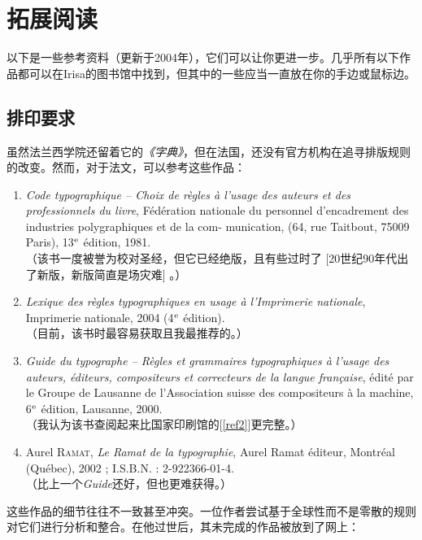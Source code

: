 \chapter{拓展阅读}\label{chap8}

以下是一些参考资料（更新于2004年），它们可以让你更进一步。几乎所有以下作品都可以在Irisa的图书馆中找到，但其中的一些应当一直放在你的手边或鼠标边。

\section{排印要求}

虽然法兰西学院还留着它的\emph{《字典》}，但在法国，还没有官方机构在追寻排版规则的改变。然而，对于法文，可以参考这些作品：

\renewcommand{\labelenumi}{[\theenumi]}

\begin{enumerate}
    \item \emph{Code typographique – Choix de règles à l'usage des auteurs et des professionnels du livre}, Fédération nationale du personnel d'encadrement des industries polygraphiques et de la com- munication, (64, rue Taitbout, 75009 Paris), 13$^{\rm e}$ édition, 1981.\\
    （该书一度被誉为校对圣经，但它已经绝版，且有些过时了 [20世纪90年代出了新版，新版简直是场灾难] 。）\label{ref1}
    \item \emph{Lexique des règles typographiques en usage à l'Imprimerie nationale}, Imprimerie nationale, 2004 (4$^{\rm e}$ édition).\\
    （目前，该书时最容易获取且我最推荐的。） \label{ref2}
    \item \emph{Guide du typographe -- Règles et grammaires typographiques à l'usage des auteurs, éditeurs, compositeurs et correcteurs de la langue française}, édité par le Groupe de Lausanne de l'Association suisse des compositeurs à la machine, 6$^{\rm e}$ édition, Lausanne, 2000.\\
    （我认为该书查阅起来比国家印刷馆的[\ref{ref2}]更完整。） \label{ref3}
    \item Aurel \textsc{Ramat}, \emph{Le Ramat de la typographie}, Aurel Ramat éditeur, Montréal (Québec), 2002 ; I.S.B.N. : 2-922366-01-4.\\
    （比上一个\emph{Guide}还好，但也更难获得。）\label{ref4}
\end{enumerate}

这些作品的细节往往不一致甚至冲突。一位作者尝试基于全球性而不是零散的规则对它们进行分析和整合。在他过世后，其未完成的作品被放到了网上：

